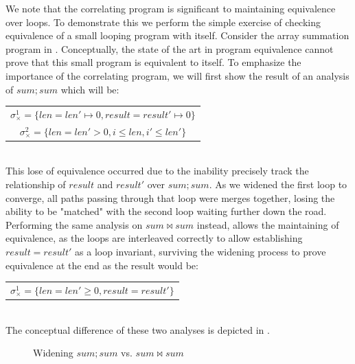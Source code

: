 We note that the correlating program is significant to maintaining equivalence over loops. To demonstrate this we perform the simple exercise of checking equivalence of a small looping program with itself. Consider the array summation program in . Conceptually, the state of the art in program equivalence cannot prove that this small program is equivalent to itself. To emphasize the importance of the correlating program, we will first show the result of an analysis of $sum;sum$ which will be:
\\
\begin{tabular}{c}
$\sigma_{\times}^1 = \{len = len' \mapsto 0, result = result' \mapsto 0\}$
\\
$\sigma_{\times}^2 = \{len = len' > 0, i \leq len, i' \leq len'\}$
\end{tabular}
\\

This lose of equivalence occurred due to the inability precisely track the relationship of $result$ and $result'$ over $sum;sum$. As we widened the first loop to converge, all paths passing through that loop were merges together, losing the ability to be "matched" with the second loop waiting further down the road. Performing the same analysis on $sum \bowtie sum$ instead, allows the maintaining of equivalence, as the loops are interleaved correctly to allow establishing $result = result'$ as a loop invariant, surviving the widening process to prove equivalence at the end as the result would be:
\\
\begin{tabular}{c}
$\sigma_{\times}^1 = \{len = len' \geq 0, result = result'\}$
\end{tabular}
\\
The conceptual difference of these two analyses is depicted in .
\begin{figure}
\caption{Widening $sum ; sum$ vs. $sum \bowtie sum$}
\end{figure}


